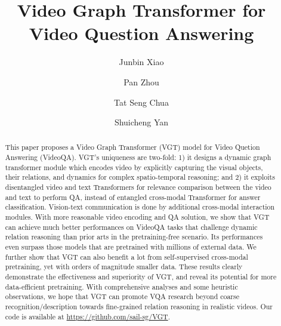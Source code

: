 \documentclass[runningheads]{llncs}
\begin{document}
\pagestyle{headings}
\mainmatter
\def\ECCVSubNumber{1735}  

\title{Video Graph Transformer for Video Question Answering} 

\begin{comment}
\titlerunning{ECCV-22 submission ID \ECCVSubNumber} 
\authorrunning{ECCV-22 submission ID \ECCVSubNumber} 
\author{Anonymous ECCV submission}
\institute{Paper ID \ECCVSubNumber}
\end{comment}




\author{
Junbin Xiao \and
Pan Zhou \and
Tat Seng Chua  \and
Shuicheng Yan
}

\maketitle

\begin{abstract}
This paper proposes a Video Graph Transformer (VGT) model for Video Quetion Answering (VideoQA).
VGT's uniqueness are two-fold: 1) it designs a dynamic graph transformer module which encodes video by explicitly capturing the visual objects, their relations, and dynamics for complex spatio-temporal reasoning; and 2) it exploits disentangled video and text Transformers for relevance comparison between the video and text to perform QA, instead of entangled cross-modal Transformer for answer classification. Vision-text communication is done by additional cross-modal interaction modules. With more reasonable video encoding and QA solution, we show that VGT can achieve much better performances on VideoQA tasks that challenge dynamic relation reasoning than prior arts in the pretraining-free scenario. Its performances even surpass those models that are pretrained with millions of external data. We further show that VGT can also benefit a lot from self-supervised cross-modal pretraining, yet with orders of magnitude smaller data. These results clearly demonstrate the effectiveness and superiority of VGT, and reveal its potential for more data-efficient pretraining. With comprehensive analyses and some heuristic observations, we hope that VGT can promote VQA research beyond coarse recognition/description towards fine-grained relation reasoning in realistic videos. Our code is available at \url{https://github.com/sail-sg/VGT}.

\end{abstract}
\end{document}
